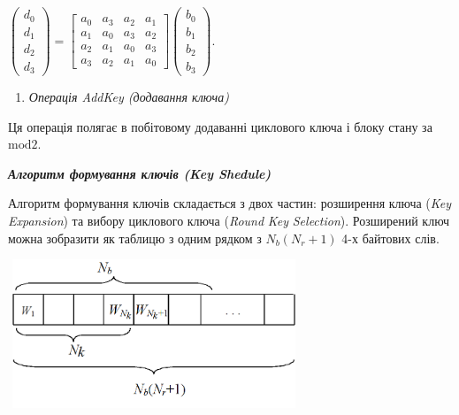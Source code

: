 \documentclass[a4paper]{article}
\newcounter{saveenum}
\newcommand\liststyleWWviiiNumxxxi{%
\renewcommand\theenumi{\arabic{enumi}}
\renewcommand\theenumii{\alph{enumii}}
\renewcommand\theenumiii{\roman{enumiii}}
\renewcommand\theenumiv{\arabic{enumiv}}
\renewcommand\labelenumi{\theenumi.}
\renewcommand\labelenumii{\theenumii.}
\renewcommand\labelenumiii{\theenumiii.}
\renewcommand\labelenumiv{\theenumiv.}
}
\newcounter{}
\begin{document}
{\centering

${\left(\begin{matrix}d_{{0}}\\d_{{1}}\\d_{{2}}\\d_{{3}}\end{matrix}\right)=\left[\begin{matrix}a_{{0}}&a_{{3}}&a_{{2}}&a_{{1}}\\a_{{1}}&a_{{0}}&a_{{3}}&a_{{2}}\\a_{{2}}&a_{{1}}&a_{{0}}&a_{{3}}\\a_{{3}}&a_{{2}}&a_{{1}}&a_{{0}}\end{matrix}\right]\left(\begin{matrix}b_{{0}}\\b_{{1}}\\b_{{2}}\\b_{{3}}\end{matrix}\right)}$.
\par}


\bigskip


\bigskip

\liststyleWWviiiNumxxxi
\setcounter{saveenum}{\value{enumi}}
\begin{enumerate}
\setcounter{enumi}{\value{saveenum}}
\item {\itshape
Операція AddKey (додавання ключа)}
\end{enumerate}

\bigskip

Ця операція полягає в побітовому додаванні циклового ключа і блоку стану за 
${\text{mod}2}$. 


\bigskip


\bigskip

{\centering\bfseries\itshape
Алгоритм формування ключів (Key Shedule)
\par}


\bigskip


\bigskip

Алгоритм формування ключів складається з двох частин: розширення ключа
(\textit{Key}\textit{ }\textit{Expansion}) та вибору циклового ключа
(\textit{Round}\textit{ }\textit{Key}\textit{ }\textit{Selection}). Розширений
ключ можна зобразити як таблицю з одним рядком з  ${N_{{b}}(N_{{r}}+1)}$ 4-х
байтових слів. 


\bigskip

{\centering  $ $
\includegraphics[width=3.3437in,height=1.75in]{crypt-img/crypt-img335.png}
\par}
\end{document}

